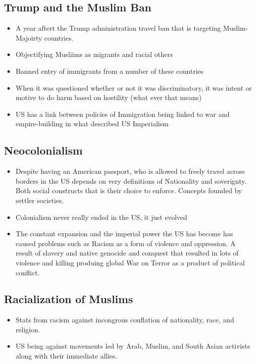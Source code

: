 \documentclass{article}
\begin{document}
  \subsection{Trump and the Muslim Ban}
  \begin{itemize}
    \item A year aftert the Trump administration travel ban
      that is targeting Muslim-Majoirty countries.
    \item Objectifying Musliims as migrants and racial others
    \item Banned entry of immigrants from a number of these countries
    \item When it was questioned whether or not it was
      discriminatory, it was intent or motive to do harm based on hostility
      (what ever that means)
    \item US has a link between policies of Immigration being linked
      to war and empire-building in what described US Imperialism
  \end{itemize}

  \subsection{Neocolonialism}
  \begin{itemize}
    \item Despite having an American passport, who is allowed
      to freely travel across borders in the US depends on very
      definitions of Nationality and soverignty.
      Both social constructs that is their choice to enforce.
      Concepts founded by settler societies.
    \item Colonialism never really ended in the US, it just evolved
    \item The constant expansion and the imperial power the US
      has become has caused problems such as Racism as a form of
      violence and oppression.
      A result of slavery and native genocide and conquest that resulted
      in lots of violence and killing produing global War on Terror
      as a product of political conflict.
  \end{itemize}


  \subsection{Racialization of Muslims}
  \begin{itemize}
    \item Stats from racism against incongrous conflation
      of nationality, race, and religion.
    \item US being against movements led by Arab, Muslim, and South Asian
      activists along with their immediate allies.
  \end{itemize}
\end{document}
